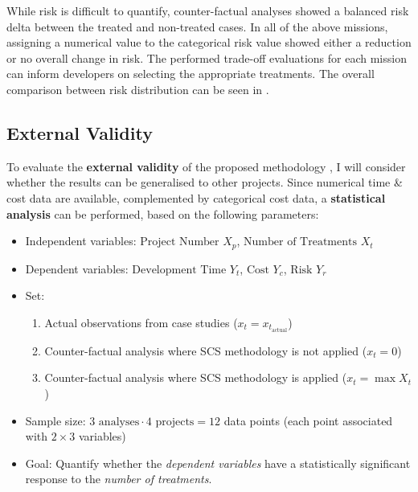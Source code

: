 \documentclass[a4paper,nobib,justified,final]{tufte-book}
\begin{document}
While risk is difficult to quantify, counter-factual analyses showed a balanced risk delta between the treated and non-treated cases. In all of the above missions, assigning a numerical value to the categorical risk value showed either a reduction or no overall change in risk. The performed trade-off evaluations for each mission can inform developers on selecting the appropriate treatments. The overall comparison between risk distribution can be seen in .

\FloatBarrier
\subsection{External Validity}

To evaluate the \textbf{external validity} of the proposed methodology \autocite{yinCaseStudyResearch2014}, I will consider whether the results can be generalised to other projects. Since numerical time \& cost data are available, complemented by categorical cost data, a \textbf{statistical analysis} can be performed, based on the following parameters:
\begin{itemize}[itemsep=-2ex]
	\item Independent variables: \( \text{Project Number } X_p  \), \( \text{Number of Treatments } X_t \)
	\item Dependent variables: \( \text{Development Time } Y_t \), \( \text{Cost } Y_c \), \( \text{Risk } Y_r \)
	\item Set:
	\begin{enumerate}[itemsep=-2pt]
		\item Actual observations from case studies (\(x_t = x_{t_{\text{actual}}} \))
		\item Counter-factual analysis where \acs{SCS} methodology is not applied (\(x_t = 0\))
		\item Counter-factual analysis where \acs{SCS} methodology is applied (\(x_t = \max X_t\))
	\end{enumerate}
	\item Sample size: \( 3\text{ analyses}\cdot 4\text{ projects} = 12 \) data points (each point associated with \(2 \times 3 \) variables)
	\item Goal: Quantify whether the \emph{dependent variables} have a statistically significant response to the \emph{number of treatments}.
\end{itemize}
\end{document}
